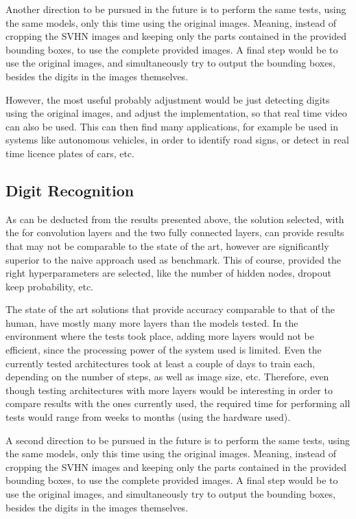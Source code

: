 \documentclass[final,12p,times]{elsarticle}
\begin{document}
\begin{Itemize}
Another direction to be pursued in the future is to perform the same tests, using the same models, only this time using the 
original images. Meaning, instead of cropping the SVHN images and keeping only the parts contained in the provided bounding boxes, 
to use the complete provided images.
A final step would be to use the original images, and simultaneously try to output the bounding boxes, besides the digits in the images 
themselves.

However, the most useful probably adjustment would be just detecting digits using the original images, and adjust the implementation, 
so that real time video can also be used.
This can then find many applications, for example be used in systems like autonomous vehicles, in order to identify road signs, 
or detect in real time licence plates of cars, etc.
\subsection{Digit Recognition}
\label{sec:6.2}
As can be deducted from the results presented above, the solution selected, with the for convolution layers and the 
two fully connected layers, can provide results that may not be comparable to the state of the art, however are significantly 
superior to the naive approach used as benchmark.
This of course, provided the right hyperparameters are selected, like the number of hidden nodes, dropout keep probability, etc.

The state of the art solutions that provide accuracy comparable to that of the human, have mostly many more layers than the models tested.
In the environment where the tests took place, adding more layers would not be efficient, since the processing power of the system used is limited.
Even the currently tested architectures took at least a couple of days to train each, depending on the number of steps, as well as image size, etc.
Therefore, even though testing architectures with more layers would be interesting in order to compare results with the ones currently used, 
the required time for performing all tests would range from weeks to months (using the hardware used).

A second direction to be pursued in the future is to perform the same tests, using the same models, only this time using the 
original images. Meaning, instead of cropping the SVHN images and keeping only the parts contained in the provided bounding boxes, 
to use the complete provided images.
A final step would be to use the original images, and simultaneously try to output the bounding boxes, besides the digits in the images 
themselves.


\end{Itemize}
\end{document}
